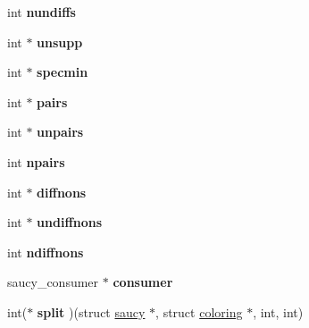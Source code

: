 \begin{DoxyCompactItemize}
\item 
\hypertarget{structsaucy_a4a5657437a366285ab7302af13f11337}{int {\bfseries nundiffs}}\label{structsaucy_a4a5657437a366285ab7302af13f11337}

\item 
\hypertarget{structsaucy_ac5a3a0a80030d62b99f27eed17a57e2d}{int $\ast$ {\bfseries unsupp}}\label{structsaucy_ac5a3a0a80030d62b99f27eed17a57e2d}

\item 
\hypertarget{structsaucy_a723aaac76801f8718669622bb54bba82}{int $\ast$ {\bfseries specmin}}\label{structsaucy_a723aaac76801f8718669622bb54bba82}

\item 
\hypertarget{structsaucy_abec9435324752b5bcb02cbe82a31bd1e}{int $\ast$ {\bfseries pairs}}\label{structsaucy_abec9435324752b5bcb02cbe82a31bd1e}

\item 
\hypertarget{structsaucy_af4815e969a73e5e0210068d69371bad8}{int $\ast$ {\bfseries unpairs}}\label{structsaucy_af4815e969a73e5e0210068d69371bad8}

\item 
\hypertarget{structsaucy_a43e8bf7f7c1fa38167f3fd5d7aa1d974}{int {\bfseries npairs}}\label{structsaucy_a43e8bf7f7c1fa38167f3fd5d7aa1d974}

\item 
\hypertarget{structsaucy_ad9760ae6db39a88fb57e6eb6697a5e55}{int $\ast$ {\bfseries diffnons}}\label{structsaucy_ad9760ae6db39a88fb57e6eb6697a5e55}

\item 
\hypertarget{structsaucy_a6cef198aa1be5fda2af744166cb394a6}{int $\ast$ {\bfseries undiffnons}}\label{structsaucy_a6cef198aa1be5fda2af744166cb394a6}

\item 
\hypertarget{structsaucy_a88dfe33adfdb28e3d63e3c5463445baa}{int {\bfseries ndiffnons}}\label{structsaucy_a88dfe33adfdb28e3d63e3c5463445baa}

\item 
\hypertarget{structsaucy_ad2aa284e5cbd5353db3aa350d2c8478a}{saucy\-\_\-consumer $\ast$ {\bfseries consumer}}\label{structsaucy_ad2aa284e5cbd5353db3aa350d2c8478a}

\item 
\hypertarget{structsaucy_a3b73cc72ca8f102ff4b5149df0e38855}{int($\ast$ {\bfseries split} )(struct \hyperlink{structsaucy}{saucy} $\ast$, struct \hyperlink{structcoloring}{coloring} $\ast$, int, int)}\label{structsaucy_a3b73cc72ca8f102ff4b5149df0e38855}


\end{DoxyCompactItemize}
